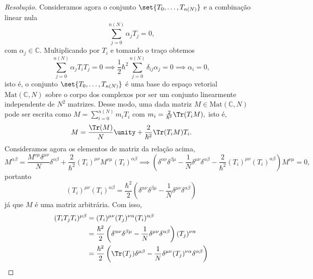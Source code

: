 \begin{proof}[Resolução]
    Consideramos agora o conjunto \(\set{T_0, \dots, T_{n(N)}}\) e a combinação linear nula
    \begin{equation*}
        \sum_{j = 0}^{n(N)} \alpha_j T_j = 0,
    \end{equation*}
    com \(\alpha_j \in \mathbb{C}.\) Multiplicando por \(T_i\) e tomando o traço obtemos
    \begin{equation*}
        \sum_{j = 0}^{n(N)} \alpha_j T_i T_j = 0 \implies \frac12 \hbar^2 \sum_{j = 0}^{n(N)} \delta_{ij} \alpha_j = 0 \implies \alpha_i = 0,
    \end{equation*}
    isto é, o conjunto \(\set{T_0, \dots, T_{n(N)}}\) é uma base do espaço vetorial \(\mathrm{Mat}(\mathbb{C}, N)\) sobre o corpo dos complexos por ser um conjunto linearmente independente de \(N^2\) matrizes. Desse modo, uma dada matriz \(M \in \mathrm{Mat}(\mathbb{C}, N)\) pode ser escrita como \(M = \sum_{i = 0}^{n(N)} m_i T_i\) com \(m_i = \frac{2}{\hbar^2}\Tr(T_iM),\) isto é,
    \begin{equation*}
        M = \frac{\Tr(M)}{N} \unity + \frac{2}{\hbar^2} \Tr(T_i M) T_i.
    \end{equation*}
    Consideramos agora os elementos de matriz da relação acima,
    \begin{equation*}
        M^{\alpha \beta} = \frac{M^{\nu\mu} \delta^{\mu\nu}}{N} \delta^{\alpha \beta} + \frac{2}{\hbar^2} (T_i)^{\mu \nu} M^{\nu \mu} (T_i)^{\alpha \beta} \implies \left(\delta^{\alpha \nu} \delta^{\beta \mu} - \frac{1}{N} \delta^{\mu\nu} \delta^{\alpha \beta} - \frac{2}{\hbar^2}(T_i)^{\mu\nu} (T_i)^{\alpha \beta}\right)M^{\nu\mu} = 0,
    \end{equation*}
    portanto
    \begin{equation*}
        (T_i)^{\mu\nu} (T_i)^{\alpha \beta} = \frac{\hbar^2}{2} \left(\delta^{\alpha \nu} \delta^{\beta \mu} - \frac{1}{N} \delta^{\mu\nu} \delta^{\alpha \beta}\right)
    \end{equation*}
    já que \(M\) é uma matriz arbitrária. Com isso,
    \begin{align*}
        (T_i T_j T_i)^{\mu \beta} &= (T_i)^{\mu\nu} (T_j)^{\nu \alpha} (T_i)^{\alpha \beta} \\
                                  &= \frac{\hbar^2}{2} \left(\delta^{\alpha \nu} \delta^{\beta \mu} - \frac{1}{N} \delta^{\mu\nu} \delta^{\alpha \beta}\right) (T_j)^{\nu \alpha} \\
                                  &= \frac{\hbar^2}{2} \left(\Tr(T_j) \delta^{\mu \beta} - \frac{1}{N} \delta^{\mu\nu} (T_j)^{\nu \alpha} \delta^{\alpha \beta}\right) \\

\end{align*}
\end{proof}
